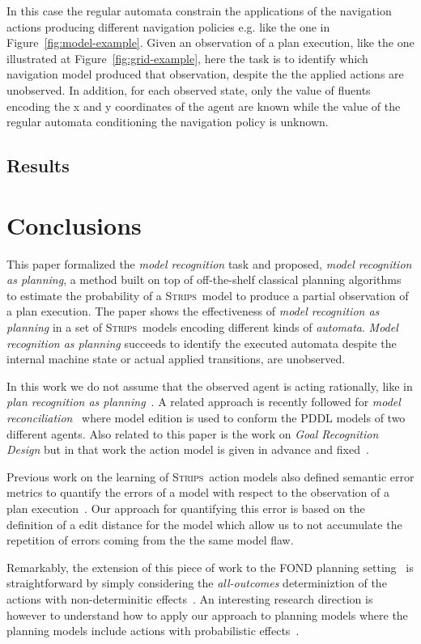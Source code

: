 \documentclass[letterpaper]{article} %
\newcommand{\strips}{\textsc{Strips}}     %
\begin{document}
In this case the regular automata constrain the applications of the navigation actions producing different navigation policies e.g. like the one in Figure~\ref{fig:model-example}. Given an observation of a plan execution, like the one illustrated at Figure~\ref{fig:grid-example}, here the task is to identify which navigation model produced that observation, despite the the applied actions are unobserved. In addition, for each observed state, only the value of fluents encoding the x and y coordinates of the agent are known while the value of the regular automata conditioning the navigation policy is unknown.


\subsection{Results}





\section{Conclusions}
\label{sec:conclussions}
This paper formalized the {\em model recognition} task and proposed, {\em model recognition as planning}, a method built on top of off-the-shelf classical planning algorithms to estimate the probability of a \strips\ model to produce a partial observation of a plan execution. The paper shows the effectiveness of {\em model recognition as planning} in a set of \strips\ models encoding different kinds of {\em automata}. {\em Model recognition as planning} succeeds to identify the executed automata despite the internal machine state or actual applied transitions, are unobserved.

In this work we do not assume that the observed agent is acting rationally, like in {\em plan recognition as planning}~\cite{ramirez2012plan,ramirez2009plan}. A related approach is recently followed for {\em model reconciliation}~\cite{Kambhampati:mreconciliation:ijcai17} where model edition is used to conform the PDDL models of two different agents. Also  related to this paper is the work on {\em Goal Recognition Design} but in that work the action model is given in advance and fixed~\cite{keren2014goal}.  


Previous work on the learning of \strips\ action models also defined semantic error metrics to quantify the errors of a model with respect to the observation of a plan execution~\cite{yang2007learning}. Our approach for quantifying this error is based on the definition of a edit distance for the model which allow us to not accumulate the repetition of errors coming from the the same model flaw.

Remarkably, the extension of this piece of work to the FOND planning setting~\cite{muise2012improved} is straightforward by simply considering the {\em all-outcomes} determiniztion of the actions with non-determinitic effects~\cite{yoon2007ff}. An interesting research direction is however to understand how to apply our approach to planning models where the planning models include actions with probabilistic effects~\cite{younes2005first}.  



\end{document}
